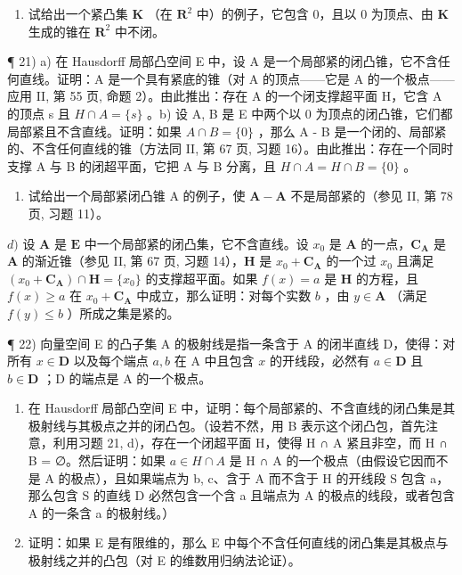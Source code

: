 \begin{enumerate}
\def\labelenumi{\arabic{enumi})}
\setcounter{enumi}{19}
\tightlist
\item
  试给出一个紧凸集 \(\mathbf{K}\) （在 \(\mathbf{R}^2\) 中）的例子，它包含 0，且以 0 为顶点、由 \(\mathbf{K}\) 生成的锥在 \(\mathbf{R}^2\) 中不闭。
\end{enumerate}

¶ 21) a) 在 Hausdorff 局部凸空间 E 中，设 A 是一个局部紧的闭凸锥，它不含任何直线。证明：A 是一个具有紧底的锥（对 A 的顶点——它是 A 的一个极点——应用 II, 第 55 页, 命题 2）。由此推出：存在 A 的一个闭支撑超平面 H，它含 A 的顶点 s 且 \(H \cap A = \{s\}\) 。b) 设 A, B 是 E 中两个以 0 为顶点的闭凸锥，它们都局部紧且不含直线。证明：如果 \(A \cap B = \{0\}\) ，那么 A - B 是一个闭的、局部紧的、不含任何直线的锥（方法同 II, 第 67 页, 习题 16）。由此推出：存在一个同时支撑 A 与 B 的闭超平面，它把 A 与 B 分离，且 \(H \cap A = H \cap B = \{0\}\) 。

\begin{enumerate}
\def\labelenumi{\alph{enumi})}
\setcounter{enumi}{2}
\tightlist
\item
  试给出一个局部紧闭凸锥 A 的例子，使 \(\mathbf{A} - \mathbf{A}\) 不是局部紧的（参见 II, 第 78 页, 习题 11）。
\end{enumerate}

\(d)\) 设 \(\mathbf{A}\) 是 \(\mathbf{E}\) 中一个局部紧的闭凸集，它不含直线。设 \(x_0\) 是 \(\mathbf{A}\) 的一点，\(\mathbf{C}_{\mathbf{A}}\) 是 \(\mathbf{A}\) 的渐近锥（参见 II, 第 67 页, 习题 14），\(\mathbf{H}\) 是 \(x_0 + \mathbf{C}_{\mathbf{A}}\) 的一个过 \(x_0\) 且满足 \((x_0 + \mathbf{C}_{\mathbf{A}}) \cap \mathbf{H} = \{x_0\}\) 的支撑超平面。如果 \(f(x) = a\) 是 \(\mathbf{H}\) 的方程，且 \(f(x) \geqslant a\) 在 \(x_0 + \mathbf{C}_{\mathbf{A}}\) 中成立，那么证明：对每个实数 \(b\) ，由 \(y \in \mathbf{A}\) （满足 \(f(y) \leqslant b\) ）所成之集是紧的。

¶ 22) 向量空间 E 的凸子集 A 的极射线是指一条含于 A 的闭半直线 D，使得：对所有 \(x \in \mathbf{D}\) 以及每个端点 \(a, b\) 在 A 中且包含 \(x\) 的开线段，必然有 \(a \in \mathbf{D}\) 且 \(b \in \mathbf{D}\) ；D 的端点是 A 的一个极点。

\begin{enumerate}
\def\labelenumi{\alph{enumi})}
\item
  在 Hausdorff 局部凸空间 E 中，证明：每个局部紧的、不含直线的闭凸集是其极射线与其极点之并的闭凸包。（设若不然，用 B 表示这个闭凸包，首先注意，利用习题 21, d)，存在一个闭超平面 H，使得 H ∩ A 紧且非空，而 H ∩ B = ∅。然后证明：如果 \(a \in H \cap A\) 是 H ∩ A 的一个极点（由假设它因而不是 A 的极点），且如果端点为 b, c、含于 A 而不含于 H 的开线段 S 包含 a，那么包含 S 的直线 D 必然包含一个含 a 且端点为 A 的极点的线段，或者包含 A 的一条含 a 的极射线。）
\item
  证明：如果 E 是有限维的，那么 E 中每个不含任何直线的闭凸集是其极点与极射线之并的凸包（对 E 的维数用归纳法论证）。
\end{enumerate}

